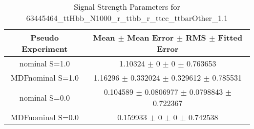\begin{table}
\centering
\caption{Signal Strength Parameters for 63445464\_ttHbb\_N1000\_r\_ttbb\_r\_ttcc\_ttbarOther\_1.1}
\begin{tabular}{cc}
\toprule
Pseudo Experiment & Mean $\pm$ Mean Error $\pm$ RMS $\pm$ Fitted Error\\
\midrule
nominal S=1.0 & \num{1.10324} $\pm$ \num{0} $\pm$ \num{0} $\pm$ \num{0.763653}\\
MDFnominal S=1.0 & \num{1.16296} $\pm$ \num{0.332024} $\pm$ \num{0.329612} $\pm$ \num{0.785531}\\
nominal S=0.0 & \num{0.104589} $\pm$ \num{0.0806977} $\pm$ \num{0.0798843} $\pm$ \num{0.722367}\\
MDFnominal S=0.0 & \num{0.159933} $\pm$ \num{0} $\pm$ \num{0} $\pm$ \num{0.742538}\\
\bottomrule
\end{tabular}
\end{table}